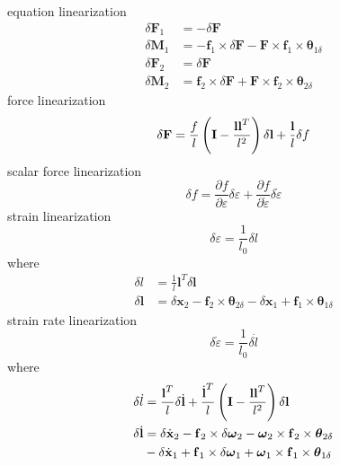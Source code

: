 \documentclass[10pt,dvips,fleqn,subeqn]{report}
\newcommand{\T}[1]{\bm{\mathbf{#1}}}
\begin{document}
equation linearization
\begin{subequations}
\begin{align}
	\delta\T{F}_1 &= -\delta\T{F} \\
	\delta\T{M}_1 &= -\T{f}_1 \times \delta\T{F} - \T{F}\times\T{f}_1\times \T{\theta}_{1\delta} \\
	\delta\T{F}_2 &= \delta\T{F} \\
	\delta\T{M}_2 &= \T{f}_2 \times \delta\T{F} + \T{F}\times\T{f}_2\times \T{\theta}_{2\delta}
\end{align}
\end{subequations}
force linearization
\begin{equation}
	\delta\T{F} = \frac{f}{l}\plbr{\T{I} - \frac{\T{l}\T{l}^T}{l^2}} \delta\T{l} + \frac{\T{l}}{l} \delta{f}
\end{equation}
scalar force linearization
\begin{equation}
	\delta{f} = \frac{\partial{f}}{\partial\varepsilon} \delta\varepsilon
	+ \frac{\partial{f}}{\partial\dot{\varepsilon}} \delta\dot{\varepsilon}
\end{equation}
strain linearization
\begin{equation}
	\delta\varepsilon = \frac{1}{l_0}\delta{l}
\end{equation}
where
\begin{subequations}
\begin{align}
	\delta{l} &= \frac{1}{l}\T{l}^T \delta\T{l} \\
	\delta\T{l} &= \delta\T{x}_2 - \T{f}_2 \times \T{\theta}_{2\delta}
		- \delta\T{x}_1 + \T{f}_1 \times \T{\theta}_{1\delta}
\end{align}
\end{subequations}
strain rate linearization
\begin{equation}
	\delta\dot{\varepsilon} = \frac{1}{l_0} \delta\dot{l}
\end{equation}
where
\begin{subequations}
\begin{align}
	\delta\dot{l} &= \frac{\T{l}^T}{l} \delta\dot{\T{l}}
		+ \frac{\dot{\T{l}}^T}{l}\plbr{\T{I} - \frac{\T{l}\T{l}^T}{l^2}} \delta\T{l} \\
	\delta\dot{\T{l}} &= \delta\dot{\T{x}}_2
		- \T{f}_2 \times \delta\T{\omega}_2 - \T{\omega}_2 \times \T{f}_2 \times \T{\theta}_{2\delta}
		\nonumber \\
		& \mbox{} - \delta\dot{\T{x}}_1
		+ \T{f}_1 \times \delta\T{\omega}_1 + \T{\omega}_1 \times \T{f}_1 \times \T{\theta}_{1\delta}
\end{align}
\end{subequations}
\end{document}

